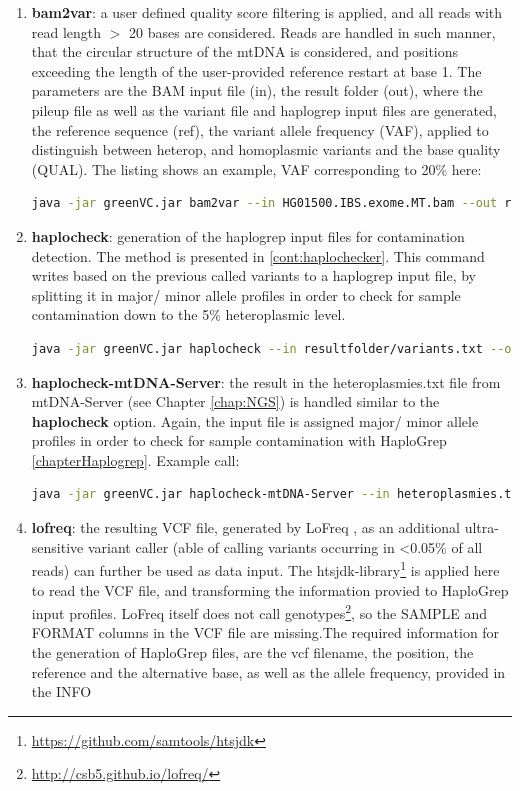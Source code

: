 \begin{enumerate}
\item \textbf{bam2var}: a user defined quality score filtering is applied, and all reads with read length $>$ 20 bases are considered. Reads are handled in such manner, that the circular structure of the mtDNA is considered, and positions exceeding the length of the user-provided reference restart at base 1. 
The parameters are the BAM input file (in), the result folder (out), where the pileup file as well as the variant file and haplogrep input files are generated, the reference sequence (ref), the variant allele frequency (VAF), applied to distinguish between heterop, and homoplasmic variants and the base quality (QUAL). The listing shows an example, VAF corresponding to 20\% here:
\begin{lstlisting}[language=bash]
java -jar greenVC.jar bam2var --in HG01500.IBS.exome.MT.bam --out resultfolder  --ref data/rcrs.fasta  --VAF 0.2 --QUAL 20
\end{lstlisting}
\item \textbf{haplocheck}: generation of the haplogrep input files for contamination detection. The method is presented in \ref{cont:haplochecker}. This command writes based on the previous called variants to a haplogrep input file, by splitting it in major/ minor allele profiles in order to check for sample contamination down to the 5\% heteroplasmic level.
\begin{lstlisting}[language=bash]
java -jar greenVC.jar haplocheck --in resultfolder/variants.txt --out haplogrepinput.hsd   --VAF 0.05 
\end{lstlisting}
\item \textbf{haplocheck-mtDNA-Server}: the result in the heteroplasmies.txt file from mtDNA-Server (see Chapter \ref{chap:NGS}) is handled similar to the \textbf{haplocheck} option. Again, the input file is assigned major/ minor allele profiles in order to check for sample contamination with HaploGrep \ref{chapterHaplogrep}. Example call:
\begin{lstlisting}[language=bash]
java -jar greenVC.jar haplocheck-mtDNA-Server --in heteroplasmies.txt --out haplogrepinput.hsd  --VAF 0.05 
\end{lstlisting}
\item \textbf{lofreq}: the resulting VCF file, generated by LoFreq \cite{Wilm2012}, as an additional ultra-sensitive variant caller (able of calling variants occurring in <0.05\% of all reads) can further be used as data input. The htsjdk-library\footnote{\url{https://github.com/samtools/htsjdk}} is applied here to read the VCF file, and transforming the information provied to HaploGrep input profiles. LoFreq itself does not call genotypes\footnote{\url{http://csb5.github.io/lofreq/}}, so the SAMPLE and FORMAT columns in the VCF file are missing.The required information for the generation of HaploGrep files, are the vcf filename, the position, the reference and the alternative base, as well as the allele frequency, provided in the INFO

\end{enumerate}

